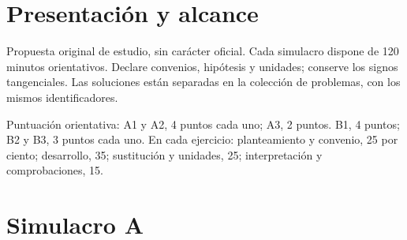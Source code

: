 \documentclass[10pt,openany]{book}
\begin{document}
\frontmatter
\studiumreadingguide
\tableofcontents
\mainmatter
\chapter*{Presentación y alcance}
Propuesta original de estudio, sin carácter oficial. Cada simulacro dispone de 120 minutos orientativos. Declare convenios, hipótesis y unidades; conserve los signos tangenciales. Las soluciones están separadas en la colección de problemas, con los mismos identificadores.\par\medskip\noindent Puntuación orientativa: A1 y A2, 4 puntos cada uno; A3, 2 puntos. B1, 4 puntos; B2 y B3, 3 puntos cada uno. En cada ejercicio: planteamiento y convenio, 25 por ciento; desarrollo, 35; sustitución y unidades, 25; interpretación y comprobaciones, 15.\par\chapter{Simulacro A}
\end{document}
